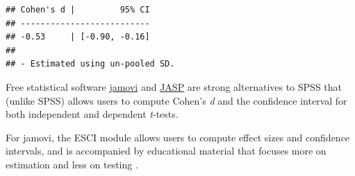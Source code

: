 \documentclass[
  oneside]{krantz}
\begin{document}
\begin{verbatim}
## Cohen's d |         95% CI
## --------------------------
## -0.53     | [-0.90, -0.16]
## 
## - Estimated using un-pooled SD.
\end{verbatim}

Free statistical software \href{https://www.jamovi.org/}{jamovi} and \href{https://jasp-stats.org/}{JASP} are strong alternatives to SPSS that (unlike SPSS) allows users to compute Cohen's \emph{d} and the confidence interval for both independent and dependent \emph{t}-tests.

For jamovi, the ESCI module allows users to compute effect sizes and confidence intervals, and is accompanied by educational material that focuses more on estimation and less on testing \citep{cumming_introduction_2016}.
\end{document}
